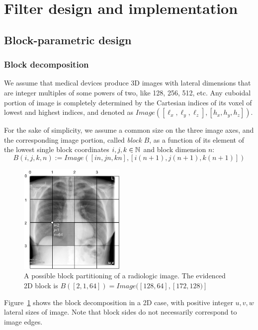 \section{Filter design and implementation}\label{sec:filter}



\subsection{Block-parametric design}\label{sec:block}

\subsubsection{Block decomposition}\label{sec:bbbb}

We assume that medical devices produce 3D images with lateral dimensions that are integer multiples of some powers of two, like 128, 256, 512, etc.
Any cuboidal portion of image is completely determined by the Cartesian indices of its voxel of lowest and highest indices, and denoted as $Image([\ell_x, \ell_y, \ell_z],[h_x, h_y, h_z])$.

For the sake of simplicity, we assume a common size on the three image axes, and the corresponding image portion, called \emph{block} $B$, as a function of its element of the  lowest single block  coordinates $i,j,k\in\mathbb{N}$ and block dimension $n$:
\[
B(i,j,k,n) := Image([in,jn,kn],[i(n+1),j(n+1),k(n+1)]) 
\]

\begin{figure}[htbp] %
   \centering
   \includegraphics[width=2in]{figs/blocks} 
   \caption{A possible block partitioning of a radiologic image. The evidenced 2D block is $B([2,1,64]) = Image([128,64],[172,128)]$}
   \label{fig:blocks}
\end{figure}


Figure~\ref{fig:blocks} shows the block decomposition in a 2D case, with positive integer $u,v,w$ lateral sizes of image. Note that block sides do not necessarily correspond to image edges. 


